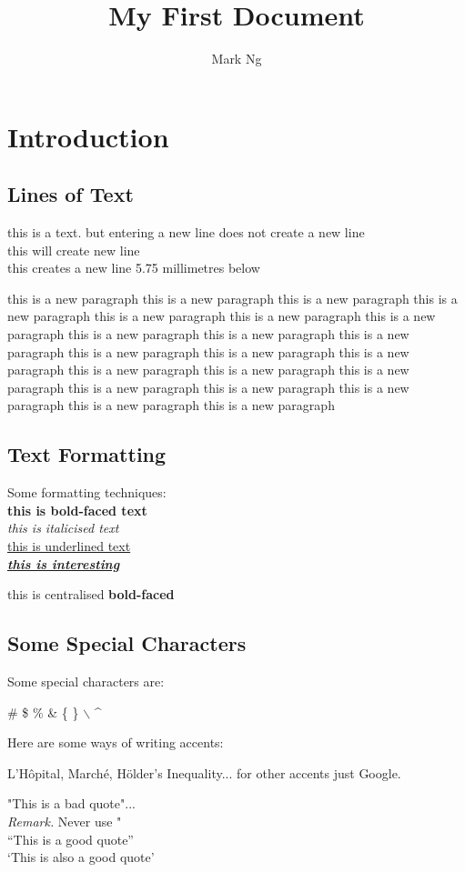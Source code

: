 \documentclass{article}
\title{My First Document}
\date{}
\author{Mark Ng}
\begin{document}
	\maketitle
	\section{Introduction}
		\subsection{Lines of Text}
			\hspace{4mm} this is a text. but
			entering
			a 
			new line
			does not create a new line\\
			this will create new line\\[5.75mm]
			this creates a new line 5.75 millimetres below
			\par this is a new paragraph this is a new paragraph this is a new paragraph this is a new paragraph this is a new paragraph this is a new paragraph this is a new paragraph this is a new paragraph this is a new paragraph this is a new paragraph this is a new paragraph this is a new paragraph this is a new paragraph this is a new paragraph this is a new paragraph this is a new paragraph this is a new paragraph this is a new paragraph this is a new paragraph this is a new paragraph this is a new paragraph 
		\subsection{Text Formatting}
			Some formatting techniques:\\[3mm]
			\textbf{this is bold-faced text}\\[3mm]
			\emph{this is italicised text}\\[3mm]
			\underline{this is underlined text}\\[3mm]
			\textbf{\emph{\underline{this is interesting}}}
			\begin{center}
				this is centralised \textbf{bold-faced}		
			\end{center}
		\subsection{Some Special Characters}
			Some special characters are:
			\begin{center}
				\# \$ \% \& \{ \} $\backslash$ \^{}
			\end{center}
			Here are some ways of writing accents:			
			\begin{center}
				L'H\^{o}pital, March\'{e}, H\"{o}lder's Inequality... for other accents just Google.
			\end{center}
			"This is a bad quote"...\\[3mm]
			\emph{Remark.} Never use "\\[3mm]
			``This is a good quote''\\
			`This is also a good quote'
\end{document}
